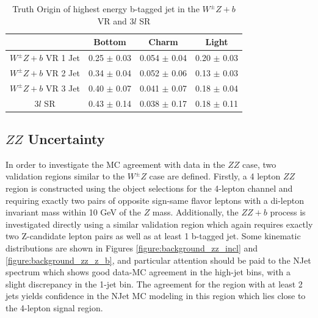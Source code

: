 \begin{table}[htbp]
\centering 
\begin{tabular}{|c|c|c|c|} 
  \hline
  & Bottom  & Charm & Light \\
  \hline
  $W^{\pm}Z+b$ VR 1 Jet& 0.25 $\pm$ 0.03 & 0.054  $\pm$ 0.04 & 0.20 $\pm$ 0.03 \\ 
  $W^{\pm}Z+b$ VR 2 Jet& 0.34 $\pm$ 0.04 & 0.052  $\pm$ 0.06 & 0.13 $\pm$ 0.03 \\ 
  $W^{\pm}Z+b$ VR 3 Jet& 0.40 $\pm$ 0.07 & 0.041  $\pm$ 0.07 & 0.18 $\pm$ 0.04 \\
  3$l$ SR              & 0.43 $\pm$ 0.14 & 0.038  $\pm$ 0.17 & 0.18 $\pm$ 0.11 \\
  \hline 
\end{tabular}
\caption{Truth Origin of highest energy b-tagged jet in the $W^{\pm}Z+b$ VR and 3$l$ SR} 
\label{table:wz_truth}
\end{table} 

\subsection{$ZZ$ Uncertainty}

In order to investigate the MC agreement with data in the $ZZ$ case, two validation regions similar to the $W^{\pm}Z$ case are defined. 
Firstly, a 4 lepton $ZZ$ region is constructed using the object selections for the 4-lepton channel and requiring exactly two pairs of 
opposite sign-same flavor leptons with a di-lepton invariant mass within 10 GeV of the $Z$ mass. Additionally, the $ZZ+b$ process 
is investigated directly using a similar validation region which again requires exactly two Z-candidate lepton pairs as well as at least 
1 b-tagged jet. Some kinematic distributions are shown in Figures \ref{figure:background_zz_incl} and \ref{figure:background_zz_z_b}, and particular attention should be paid to the NJet spectrum 
which shows good data-MC agreement in the high-jet bins, with a slight discrepancy in the 1-jet bin. The agreement for the region with at least 
2 jets yields confidence in the NJet MC modeling in this region which lies close to the 4-lepton signal region. 

